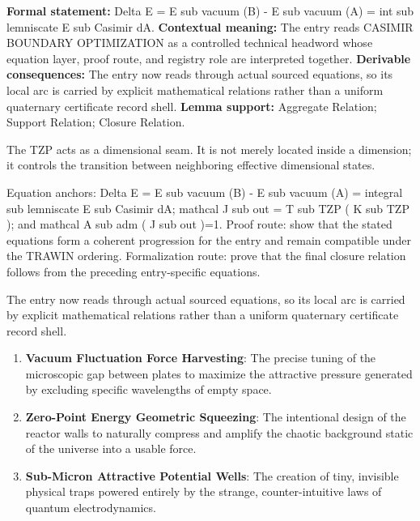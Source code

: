 \begingroup\footnotesize\setlength{\emergencystretch}{3em}\sloppy
\textbf{Formal statement:} Delta E = E sub vacuum (B) - E sub vacuum (A) = int sub lemniscate E sub Casimir dA. \textbf{Contextual meaning:} The entry reads CASIMIR BOUNDARY OPTIMIZATION as a controlled technical headword whose equation layer, proof route, and registry role are interpreted together. \textbf{Derivable consequences:} The entry now reads through actual sourced equations, so its local arc is carried by explicit mathematical relations rather than a uniform quaternary certificate record shell. \textbf{Lemma support:} Aggregate Relation; Support Relation; Closure Relation.\par
\endgroup

The TZP acts as a dimensional seam. It is not merely located inside a dimension; it controls the transition between neighboring effective dimensional states.

Equation anchors: Delta E = E sub vacuum (B) - E sub vacuum (A) = integral sub lemniscate E sub Casimir dA; mathcal J sub out = T sub TZP ( K sub TZP ); and mathcal A sub adm ( J sub out )=1. Proof route: show that the stated equations form a coherent progression for the entry and remain compatible under the TRAWIN ordering. Formalization route: prove that the final closure relation follows from the preceding entry-specific equations.

The entry now reads through actual sourced equations, so its local arc is carried by explicit mathematical relations rather than a uniform quaternary certificate record shell.
\endgroup

\begin{enumerate}[leftmargin=1.6em,itemsep=6pt,topsep=4pt]
\item \textbf{Vacuum Fluctuation Force Harvesting}: The precise tuning of the microscopic gap between plates to maximize the attractive pressure generated by excluding specific wavelengths of empty space.
\item \textbf{Zero-Point Energy Geometric Squeezing}: The intentional design of the reactor walls to naturally compress and amplify the chaotic background static of the universe into a usable force.
\item \textbf{Sub-Micron Attractive Potential Wells}: The creation of tiny, invisible physical traps powered entirely by the strange, counter-intuitive laws of quantum electrodynamics.
\end{enumerate}

